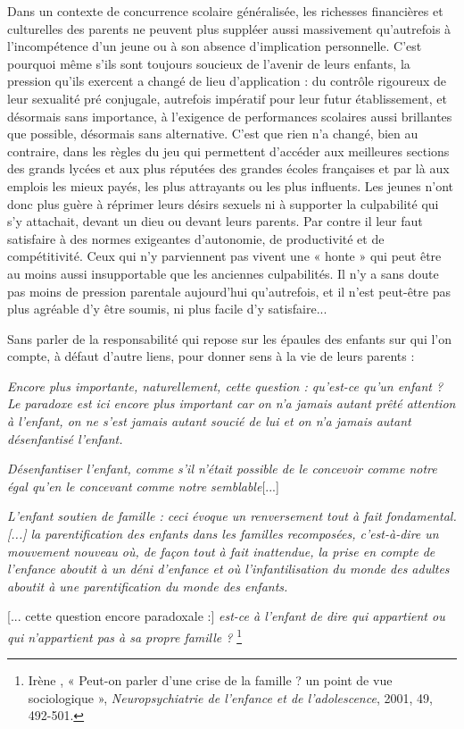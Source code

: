  Dans un contexte de concurrence scolaire généralisée, les richesses financières et culturelles des parents ne peuvent plus suppléer aussi massivement qu'autrefois à l'incompétence d'un jeune ou à son absence d'implication personnelle. C'est pourquoi même s'ils sont toujours soucieux de l'avenir de leurs enfants, la pression qu'ils exercent a changé de lieu d'application : du contrôle rigoureux de leur sexualité pré conjugale, autrefois impératif pour leur futur établissement, et désormais sans importance, à l'exigence de performances scolaires aussi brillantes que possible, désormais sans alternative. C'est que rien n'a changé, bien au contraire, dans les règles du jeu qui permettent d'accéder aux meilleures sections des grands lycées et aux plus réputées des grandes écoles françaises et par là aux emplois les mieux payés, les plus attrayants ou les plus influents. Les jeunes n'ont donc plus guère à réprimer leurs désirs sexuels ni à supporter la culpabilité qui s'y attachait, devant un dieu ou devant leurs parents. Par contre il leur faut satisfaire à des normes exigeantes d'autonomie, de productivité et de compétitivité. Ceux qui n'y parviennent pas vivent une « honte » qui peut être au moins aussi insupportable que les anciennes culpabilités. Il n'y a sans doute pas moins de pression parentale aujourd'hui qu'autrefois, et il n'est peut-être pas plus agréable d'y être soumis, ni plus facile d'y satisfaire... 

 Sans parler de la responsabilité qui repose sur les épaules des enfants sur qui l'on compte, à défaut d'autre liens, pour donner sens à la vie de leurs parents :

\begin{displayquote}
\emph{Encore plus importante, naturellement, cette question : qu'est-ce qu'un enfant ? Le paradoxe est ici encore plus important car on n'a jamais autant prêté attention à l'enfant, on ne s'est jamais autant soucié de lui et on n'a jamais autant désenfantisé l'enfant.}
 
\emph{Désenfantiser l'enfant, comme s'il n'était possible de le concevoir comme notre égal qu'en le concevant comme notre semblable}[...]

\emph{L'enfant soutien de famille : ceci évoque un renversement tout à fait fondamental. \emph{[...]} la parentification des enfants dans les familles recomposées, c'est-à-dire un mouvement nouveau où, de façon tout à fait inattendue, la prise en compte de l'enfance aboutit à un déni d'enfance et où l'infantilisation du monde des adultes aboutit à une parentification du monde des enfants.}

 [... cette question encore paradoxale :] \emph{est-ce à l'enfant de dire qui appartient ou qui n'appartient pas à sa propre famille ?}%
\footnote{Irène , « Peut-on parler d'une crise de la famille ? un point de vue sociologique », \emph{Neuropsychiatrie de l'enfance et de l'adolescence}, 2001, 49, 492-501.} 
\end{displayquote}

